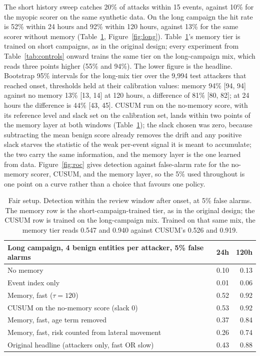 \documentclass[11pt,letterpaper]{article}
\begin{document}
The short history sweep catches 20\% of attacks within 15 events, against 10\% for the myopic scorer on the same synthetic data. On the long campaign the hit rate is 52\% within 24 hours and 92\% within 120 hours, against 13\% for the same scorer without memory (Table~\ref{tab:fair}, Figure~\ref{fig:long}). Table~\ref{tab:fair}'s memory tier is trained on short campaigns, as in the original design; every experiment from Table~\ref{tab:controls} onward trains the same tier on the long-campaign mix, which reads three points higher (55\% and 94\%). The lower figure is the headline. Bootstrap 95\% intervals for the long-mix tier over the 9,994 test attackers that reached onset, thresholds held at their calibration values: memory 94\% [94, 94] against no memory 13\% [13, 14] at 120 hours, a difference of 81\% [80, 82]; at 24 hours the difference is 44\% [43, 45]. CUSUM run on the no-memory score, with its reference level and slack set on the calibration set, lands within two points of the memory layer at both windows (Table~\ref{tab:fair}); the slack chosen was zero, because subtracting the mean benign score already removes the drift and any positive slack starves the statistic of the weak per-event signal it is meant to accumulate; the two carry the same information, and the memory layer is the one learned from data. Figure~\ref{fig:roc} gives detection against false-alarm rate for the no-memory scorer, CUSUM, and the memory layer, so the 5\% used throughout is one point on a curve rather than a choice that favours one policy.

\begin{table}[H]\centering\small
\begin{tabular}{lrr}
\toprule
Long campaign, 4 benign entities per attacker, 5\% false alarms & 24h & 120h \\
\midrule
No memory & 0.10 & 0.13 \\
Event index only & 0.01 & 0.06 \\
Memory, fast ($\tau=120$) & 0.52 & 0.92 \\
CUSUM on the no-memory score (slack 0) & 0.53 & 0.92 \\
Memory, fast, age term removed & 0.37 & 0.84 \\
Memory, fast, risk counted from lateral movement & 0.26 & 0.74 \\
Original headline (attackers only, fast OR slow) & 0.43 & 0.88 \\
\bottomrule
\end{tabular}
\caption{Fair setup. Detection within the review window after onset, at 5\% false alarms. The memory row is the short-campaign-trained tier, as in the original design; the CUSUM row is trained on the long-campaign mix. Trained on that same mix, the memory tier reads 0.547 and 0.940 against CUSUM's 0.526 and 0.919.}\label{tab:fair}
\end{table}
\end{document}
